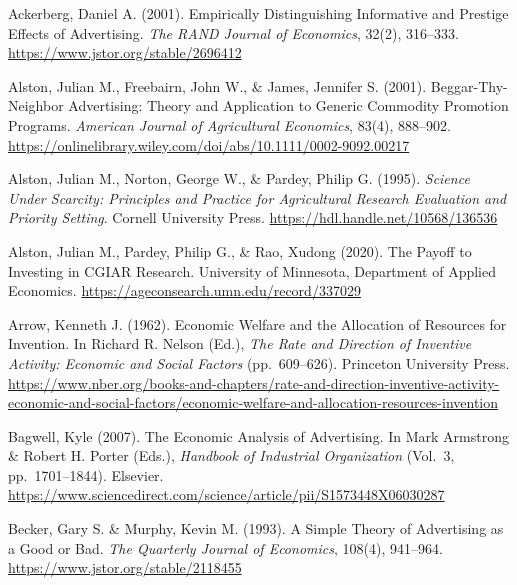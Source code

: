 \documentclass[sn-mathphys-ay]{sn-jnl} %
\theoremstyle{remark}
\begin{document}
\begin{thebibliography}{}
Ackerberg, Daniel A. (2001).
\newblock Empirically Distinguishing Informative and Prestige Effects of Advertising.
\newblock \emph{The RAND Journal of Economics}, 32(2), 316--333.
\newblock \url{https://www.jstor.org/stable/2696412}

Alston, Julian M., Freebairn, John W., \& James, Jennifer S. (2001).
\newblock Beggar-Thy-Neighbor Advertising: Theory and Application to Generic Commodity Promotion Programs.
\newblock \emph{American Journal of Agricultural Economics}, 83(4), 888--902.
\newblock \url{https://onlinelibrary.wiley.com/doi/abs/10.1111/0002-9092.00217}

Alston, Julian M., Norton, George W., \& Pardey, Philip G. (1995).
\newblock \emph{Science Under Scarcity: Principles and Practice for Agricultural Research Evaluation and Priority Setting}.
\newblock Cornell University Press.
\newblock \url{https://hdl.handle.net/10568/136536}

Alston, Julian M., Pardey, Philip G., \& Rao, Xudong (2020).
\newblock The Payoff to Investing in CGIAR Research.
\newblock University of Minnesota, Department of Applied Economics.
\newblock \url{https://ageconsearch.umn.edu/record/337029}

Arrow, Kenneth J. (1962).
\newblock Economic Welfare and the Allocation of Resources for Invention.
\newblock In Richard R. Nelson (Ed.), \emph{The Rate and Direction of Inventive Activity: Economic and Social Factors} (pp.\ 609--626).
\newblock Princeton University Press.
\newblock \url{https://www.nber.org/books-and-chapters/rate-and-direction-inventive-activity-economic-and-social-factors/economic-welfare-and-allocation-resources-invention}

Bagwell, Kyle (2007).
\newblock The Economic Analysis of Advertising.
\newblock In Mark Armstrong \& Robert H. Porter (Eds.), \emph{Handbook of Industrial Organization} (Vol.\ 3, pp.\ 1701--1844).
\newblock Elsevier.
\newblock \url{https://www.sciencedirect.com/science/article/pii/S1573448X06030287}

Becker, Gary S. \& Murphy, Kevin M. (1993).
\newblock A Simple Theory of Advertising as a Good or Bad.
\newblock \emph{The Quarterly Journal of Economics}, 108(4), 941--964.
\newblock \url{https://www.jstor.org/stable/2118455}


\end{thebibliography}
\end{document}
